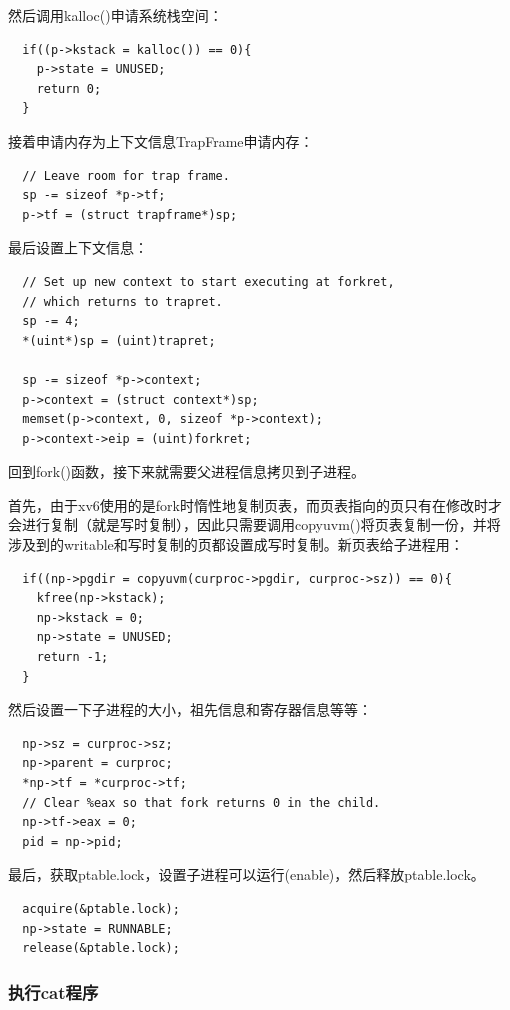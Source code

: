 然后调用kalloc()申请系统栈空间：

\begin{verbatim}
  if((p->kstack = kalloc()) == 0){
    p->state = UNUSED;
    return 0;
  }
\end{verbatim}

接着申请内存为上下文信息TrapFrame申请内存：

\begin{verbatim}
  // Leave room for trap frame.
  sp -= sizeof *p->tf;
  p->tf = (struct trapframe*)sp;
\end{verbatim}

最后设置上下文信息：

\begin{verbatim}
  // Set up new context to start executing at forkret,
  // which returns to trapret.
  sp -= 4;
  *(uint*)sp = (uint)trapret;

  sp -= sizeof *p->context;
  p->context = (struct context*)sp;
  memset(p->context, 0, sizeof *p->context);
  p->context->eip = (uint)forkret;
\end{verbatim}

回到fork()函数，接下来就需要父进程信息拷贝到子进程。

首先，由于xv6使用的是fork时惰性地复制页表，而页表指向的页只有在修改时才会进行复制（就是写时复制），因此只需要调用copyuvm()将页表复制一份，并将涉及到的writable和写时复制的页都设置成写时复制。新页表给子进程用：

\begin{verbatim}
  if((np->pgdir = copyuvm(curproc->pgdir, curproc->sz)) == 0){
    kfree(np->kstack);
    np->kstack = 0;
    np->state = UNUSED;
    return -1;
  }
\end{verbatim}

然后设置一下子进程的大小，祖先信息和寄存器信息等等：

\begin{verbatim}
  np->sz = curproc->sz;
  np->parent = curproc;
  *np->tf = *curproc->tf;
  // Clear %eax so that fork returns 0 in the child.
  np->tf->eax = 0;
  pid = np->pid;
\end{verbatim}

最后，获取ptable.lock，设置子进程可以运行(enable)，然后释放ptable.lock。

\begin{verbatim}
  acquire(&ptable.lock);
  np->state = RUNNABLE;
  release(&ptable.lock);
\end{verbatim}

\subsubsection{执行cat程序}

